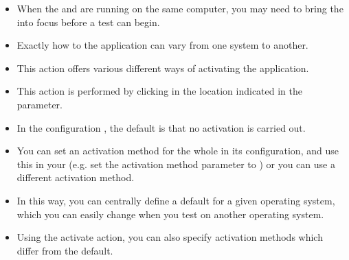 \label{activate}
\begin{itemize}
\item When the \ite{} and \gdagent are running on the same computer, you may need to bring the \gdaut{} into focus before a test can begin.
\item Exactly how to  the application can vary from one system to another.
\item This action offers various different ways of activating the application.
\item This action is performed by clicking in the location indicated in the  parameter.
\item In the \gdaut{} configuration , the default is that no activation is carried out. 
\item You can set an activation method for the whole \gdaut{} in  its configuration, and use this in your \gdsteps{} (e.g. set the activation method parameter to ) or you can use a different activation method.
\item In this way, you can centrally define a default for a given operating system, which you can easily change when you test on another operating system.
\item Using the activate action, you can also specify activation methods which differ from the default.

 
\end{itemize}



  
